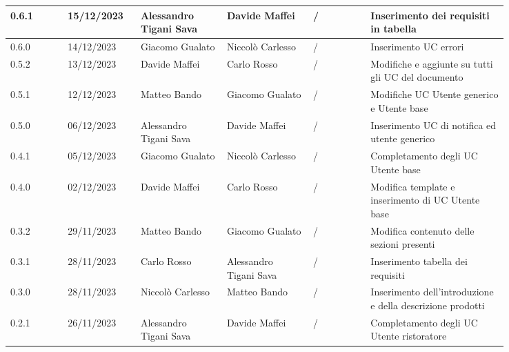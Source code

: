 {\begin{longtable}{p{0.10\linewidth}p{0.10\linewidth}p{0.15\linewidth}p{0.15\linewidth}p{0.10\linewidth}p{0.24\linewidth}}
	  0.6.1             & 15/12/2023    & Alessandro Tigani Sava & Davide Maffei          & /                      & Inserimento dei requisiti in tabella                                     \\
	  \hline
	  0.6.0             & 14/12/2023    & Giacomo Gualato        & Niccolò Carlesso       & /                      & Inserimento UC errori                                                    \\
	  \hline
	  0.5.2             & 13/12/2023    & Davide Maffei          & Carlo Rosso            & /                      & Modifiche e aggiunte su tutti gli UC del documento                       \\
	  \hline
	  0.5.1             & 12/12/2023    & Matteo Bando           & Giacomo Gualato        & /                      & Modifiche UC Utente generico e Utente base                               \\
	  \hline
	  0.5.0             & 06/12/2023    & Alessandro Tigani Sava & Davide Maffei          & /                      & Inserimento UC di notifica ed utente generico                            \\
	  \hline
	  0.4.1             & 05/12/2023    & Giacomo Gualato        & Niccolò Carlesso       & /                      & Completamento degli UC Utente base                                       \\
	  \hline
	  0.4.0             & 02/12/2023    & Davide Maffei          & Carlo Rosso            & /                      & Modifica template e inserimento di UC Utente base                        \\
	  \hline
	  0.3.2             & 29/11/2023    & Matteo Bando           & Giacomo Gualato        & /                      & Modifica contenuto delle sezioni presenti                                \\
	  \hline
	  0.3.1             & 28/11/2023    & Carlo Rosso            & Alessandro Tigani Sava & /                      & Inserimento tabella dei requisiti                                        \\
	  \hline
	  0.3.0             & 28/11/2023    & Niccolò Carlesso       & Matteo Bando           & /                      & Inserimento dell'introduzione e della descrizione prodotti               \\
	  \hline
	  0.2.1             & 26/11/2023    & Alessandro Tigani Sava & Davide Maffei          & /                      & Completamento degli UC Utente ristoratore                                \\

\end{longtable}}
